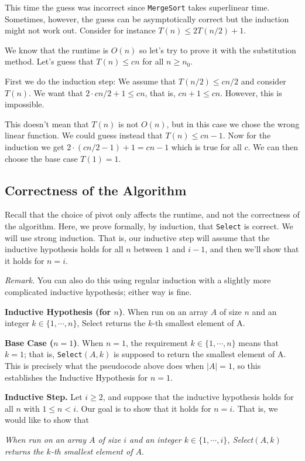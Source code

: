 \documentclass [12pt]{article}
\begin{document}
This time the guess was incorrect since \texttt{MergeSort} takes superlinear time. Sometimes, however, the guess can be asymptotically correct but the induction might not work out. Consider for instance $T(n) \leq 2T(n/2) + 1$.

We know that the runtime is $O(n)$ so let's try to prove it with the substitution method. Let's guess that $T(n) \leq cn$ for all $n \geq n_0$.

First we do the induction step: We assume that $T(n/2) \leq cn/2$ and consider $T(n)$. We
want that $2 \cdot cn/2 + 1 \leq cn$, that is, $cn + 1 \leq cn$. However, this is impossible.

This doesn't mean that $T(n)$ is not $O(n)$, but in this case we chose the wrong linear function. We could guess instead that $T(n) \leq cn-1$. Now for the induction we get $2\cdot(cn/2-1)+1 = cn - 1$ which is true for all $c$. We can then choose the base case $T(1) = 1$.

\subsection{Correctness of the Algorithm}
Recall that the choice of pivot only affects the runtime, and not the correctness of the algorithm. Here, we prove formally, by induction, that \texttt{Select} is correct. We will use strong induction. That is, our inductive step will assume that the inductive hypothesis holds for all $n$ between $1$ and $i -1$, and then we’ll show that it holds for $n = i$.

\textit{Remark.} You can also do this using regular induction with a slightly more complicated inductive hypothesis; either way is fine.

\textbf{Inductive Hypothesis (for $n$)}. When run on an array $A$ of size $n$ and an integer $k \in \{1, \cdots , n\}$, Select returns the $k$-th smallest element of A.

\textbf{Base Case ($n = 1$)}. When $n = 1$, the requirement $k \in \{1, \cdots , n\}$ means that $k = 1$; that is, \texttt{Select}$(A, k)$ is supposed to return the smallest element of A. This is precisely what the pseudocode above does when $|A| = 1$, so this establishes the Inductive Hypothesis for $n = 1$.

\textbf{Inductive Step.} Let $i \geq 2$, and suppose that the inductive hypothesis holds for all $n$ with $1 \leq n < i$. Our goal is to show that it holds for $n = i$. That is, we would like to show that 

    \textit{When run on an array $A$ of size $i$ and an integer $k \in \{1, \cdots, i\}$, Select$(A, k)$ returns the $k$-th smallest element of $A$}.
\end{document}
